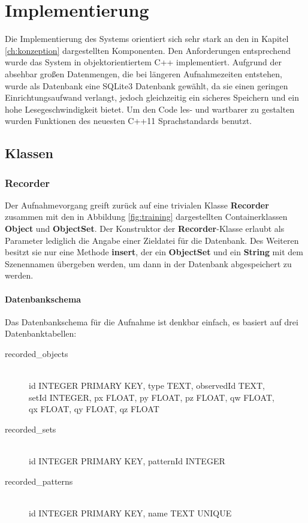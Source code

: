 \chapter{Implementierung}\label{ch:implementierung}

Die Implementierung des Systems orientiert sich sehr stark an den in Kapitel \vref{ch:konzeption} dargestellten Komponenten.
Den Anforderungen entsprechend wurde das System in objektorientiertem C++ implementiert.
Aufgrund der absehbar großen Datenmengen, die bei längeren Aufnahmezeiten entstehen, wurde als Datenbank eine SQLite3 Datenbank gewählt, da sie einen geringen Einrichtungsaufwand verlangt, jedoch gleichzeitig ein sicheres Speichern und ein hohe Lesegeschwindigkeit bietet.
Um den Code les- und wartbarer zu gestalten wurden Funktionen des neuesten C++11 Sprachstandards benutzt.

\section{Klassen}

\subsection{Recorder}

Der Aufnahmevorgang greift zurück auf eine trivialen Klasse \textbf{Recorder} zusammen mit den in Abbildung \vref{fig:training} dargestellten Containerklassen \textbf{Object} und \textbf{ObjectSet}.
Der Konstruktor der \textbf{Recorder}-Klasse erlaubt als Parameter lediglich die Angabe einer Zieldatei für die Datenbank.
Des Weiteren besitzt sie nur eine Methode \textbf{insert}, der ein \textbf{ObjectSet} und ein \textbf{String} mit dem Szenennamen übergeben werden, um dann in der Datenbank abgespeichert zu werden.

\subsubsection{Datenbankschema}

Das Datenbankschema für die Aufnahme ist denkbar einfach, es basiert auf drei Datenbanktabellen:

\begin{description}
  \item[recorded\_objects] \hfill \\
    id INTEGER PRIMARY KEY, type TEXT, observedId TEXT,\\ setId INTEGER, px FLOAT, py FLOAT, pz FLOAT, qw FLOAT,\\qx FLOAT, qy FLOAT, qz FLOAT
  \item[recorded\_sets] \hfill \\
    id INTEGER PRIMARY KEY, patternId INTEGER
  \item[recorded\_patterns] \hfill \\
    id INTEGER PRIMARY KEY, name TEXT UNIQUE
\end{description}

